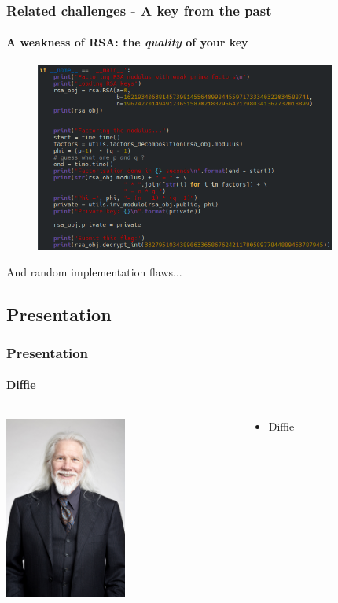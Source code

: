 \documentclass[]{beamer}
\begin{document}
\begin{frame}
\frametitle{Related challenges - A key from the past}
\framesubtitle{A weakness of RSA: the \textit{quality} of your key}
\begin{center}
    \includegraphics[height=6.2cm, width=12.0cm]{./images/RSA-weak-prime-factors.png}
\end{center}
And random implementation flaws...
\end{frame}



\subsection{Presentation}
\begin{frame}
\frametitle{Presentation}
\framesubtitle{Diffie}
\begin{columns}
    \begin{column}{5cm}
        \begin{center}
            \includegraphics[height=6.0cm, width=4.0cm]{./images/Whitfield_Diffie_Royal_Society.jpg}
        \end{center}
    \end{column}
    \begin{column}{5cm}
        \begin{itemize}
            \item Diffie
        \end{itemize}
    \end{column}
\end{columns}
\end{frame}
\end{document}
